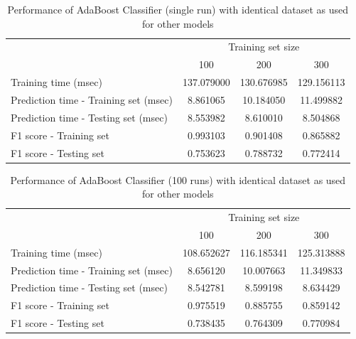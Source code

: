\documentclass{article}
\begin{document}
	\begin{table}[!ht]
		\centering
		\begin{tabular}{l|ccc}
			\toprule
			{} & \multicolumn{3}{c}{Training set size} \\
			{} &         100 &         200 &         300 \\
			\midrule
			Training time (msec)                  &  137.079000 &  130.676985 &  129.156113 \\
			Prediction time - Training set (msec) &    8.861065 &   10.184050 &   11.499882 \\
			Prediction time - Testing set (msec)  &    8.553982 &    8.610010 &    8.504868 \\
			F1 score - Training set               &    0.993103 &    0.901408 &    0.865882 \\
			F1 score - Testing set                &    0.753623 &    0.788732 &    0.772414 \\
			\bottomrule
		\end{tabular}
		\caption{Performance of AdaBoost Classifier (single run) with identical dataset as used for other models}
		\label{tab:adaboost_weak_unbalanced_1}
	\end{table}
	
	\begin{table}[!ht]
		\centering
		\begin{tabular}{l|ccc}
			\toprule
			{} & \multicolumn{3}{c}{Training set size} \\
			{} &         100 &         200 &         300 \\
			\midrule
			Training time (msec)                  &  108.652627 &  116.185341 &  125.313888 \\
			Prediction time - Training set (msec) &    8.656120 &   10.007663 &   11.349833 \\
			Prediction time - Testing set (msec)  &    8.542781 &    8.599198 &    8.634429 \\
			F1 score - Training set               &    0.975519 &    0.885755 &    0.859142 \\
			F1 score - Testing set                &    0.738435 &    0.764309 &    0.770984 \\
			\bottomrule
		\end{tabular}
		\caption{Performance of AdaBoost Classifier (100 runs) with identical dataset as used for other models}
		\label{tab:adaboost_weak_unbalanced_100}
	\end{table}
	
\end{document}
